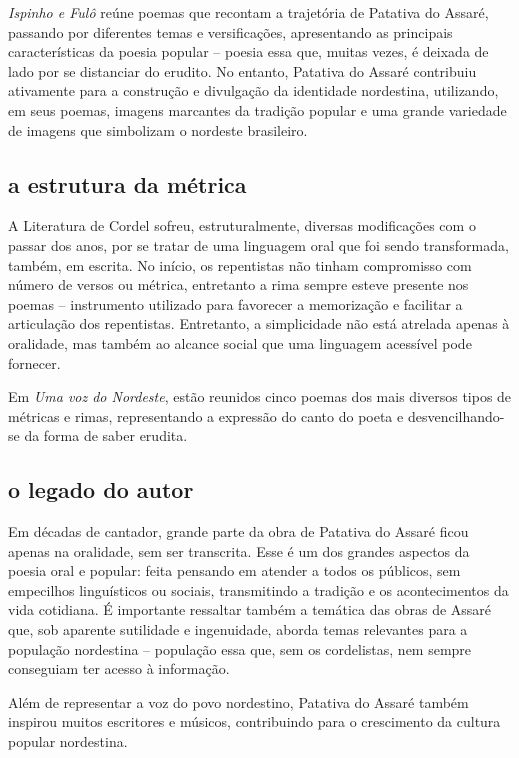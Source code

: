\documentclass[12pt]{extarticle}
\begin{document}
\emph{Ispinho e Fulô} reúne poemas que recontam a trajetória de Patativa
do Assaré, passando por diferentes temas e versificações, apresentando
as principais características da poesia popular -- poesia essa que,
muitas vezes, é deixada de lado por se distanciar do erudito. No
entanto, Patativa do Assaré contribuiu ativamente para a construção e
divulgação da identidade nordestina, utilizando, em seus poemas, imagens
marcantes da tradição popular e uma grande variedade de imagens que
simbolizam o nordeste brasileiro.

\subsection{a estrutura da métrica}

A Literatura de Cordel sofreu, estruturalmente, diversas modificações
com o passar dos anos, por se tratar de uma linguagem oral que foi sendo
transformada, também, em escrita. No início, os repentistas não tinham
compromisso com número de versos ou métrica, entretanto a rima sempre
esteve presente nos poemas -- instrumento utilizado para favorecer a
memorização e facilitar a articulação dos repentistas. Entretanto, a
simplicidade não está atrelada apenas à oralidade, mas também ao alcance
social que uma linguagem acessível pode fornecer.

Em \emph{Uma voz do Nordeste}, estão reunidos cinco poemas dos mais
diversos tipos de métricas e rimas, representando a expressão do canto
do poeta e desvencilhando-se da forma de saber erudita.

\subsection{o legado do autor}

Em décadas de cantador, grande parte da obra de Patativa do Assaré ficou
apenas na oralidade, sem ser transcrita. Esse é um dos grandes aspectos
da poesia oral e popular: feita pensando em atender a todos os públicos,
sem empecilhos linguísticos ou sociais, transmitindo a tradição e os
acontecimentos da vida cotidiana. É importante ressaltar também a
temática das obras de Assaré que, sob aparente sutilidade e ingenuidade,
aborda temas relevantes para a população nordestina -- população essa
que, sem os cordelistas, nem sempre conseguiam ter acesso à informação.

Além de representar a voz do povo nordestino, Patativa do Assaré também
inspirou muitos escritores e músicos, contribuindo para o crescimento da
cultura popular nordestina.
\end{document}
